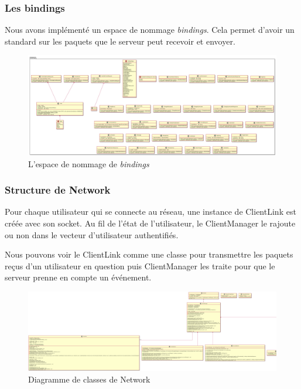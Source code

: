 \documentclass{article}
\begin{document}
\subsubsection*{Les bindings}

Nous avons implémenté un espace de nommage \textit{bindings}. Cela permet d'avoir un standard sur les paquets que le serveur peut recevoir et envoyer.

\begin{figure}[H]
	\centering
	 \includegraphics[scale=0.1, angle=90]{../../res/uml/class/BindingClass.png}
	 \caption{L'espace de nommage de \textit{bindings}}
	 \label{fig:BindingDiagram}
\end{figure}

\subsubsection*{Structure de Network}

Pour chaque utilisateur qui se connecte au réseau, une instance de ClientLink est créée avec son socket. Au fil de l'état de l'utilisateur, le ClientManager le rajoute ou non dans le vecteur d'utilisateur authentifiés.

Nous pouvons voir le ClientLink comme une classe pour transmettre les paquets reçus d'un utilisateur en question puis ClientManager les traite pour que le serveur prenne en compte un événement.

\begin{figure}[H]
	\centering
	 \includegraphics[scale=0.2]{../../res/uml/class/NetworkClass.png}
	 \caption{Diagramme de classes de Network}
	 \label{fig:NetworkDiagram}
\end{figure}
\end{document}
